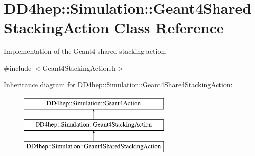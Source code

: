 \hypertarget{class_d_d4hep_1_1_simulation_1_1_geant4_shared_stacking_action}{}\section{D\+D4hep\+:\+:Simulation\+:\+:Geant4\+Shared\+Stacking\+Action Class Reference}
\label{class_d_d4hep_1_1_simulation_1_1_geant4_shared_stacking_action}


Implementation of the Geant4 shared stacking action.  




{\ttfamily \#include $<$Geant4\+Stacking\+Action.\+h$>$}

Inheritance diagram for D\+D4hep\+:\+:Simulation\+:\+:Geant4\+Shared\+Stacking\+Action\+:\begin{figure}[H]
\begin{center}
\leavevmode
\includegraphics[height=3.000000cm]{class_d_d4hep_1_1_simulation_1_1_geant4_shared_stacking_action}
\end{center}
\end{figure}
